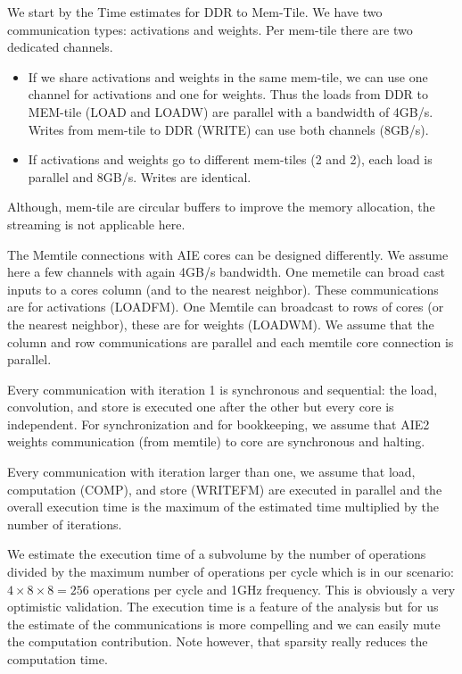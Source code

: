 \documentclass[sigconf]{acmart}
\begin{document}
We start by the Time estimates for DDR to Mem-Tile. We have two
communication types: activations and weights. Per mem-tile there are
two dedicated channels.
\begin{itemize}
 \item If we share activations and weights in the same mem-tile, we
   can use one channel for activations and one for weights. Thus the
   loads from DDR to MEM-tile (LOAD and LOADW) are parallel with a
   bandwidth of 4GB/s. Writes from mem-tile to DDR (WRITE) can use
   both channels (8GB/s). 

 \item If activations and weights go to different mem-tiles (2 and 2),
   each load is parallel and 8GB/s. Writes
   are identical.
\end{itemize}
Although, mem-tile are circular buffers to improve the memory
allocation, the streaming  is not applicable
here. %
   

The Memtile connections with AIE cores can be designed differently. We
assume here a few channels with again 4GB/s bandwidth. One memetile
can broad cast inputs to a cores column (and to the nearest
neighbor). These communications are for activations (LOADFM). One
Memtile can broadcast to rows of cores (or the nearest neighbor),
these are for weights (LOADWM). We assume that the column and row
communications are parallel and each memtile core connection is
parallel.

Every communication with iteration 1 is synchronous and sequential:
the load, convolution, and store is executed one after the other but
every core is independent.  For synchronization and for bookkeeping,
we assume that AIE2 weights communication (from memtile) to core are
synchronous and halting.

Every communication with iteration larger than one, we assume that
load, computation (COMP), and store (WRITEFM) are executed in parallel
and the overall execution time is the maximum of the estimated time
multiplied by the number of iterations.

We estimate the execution time of a subvolume by the number of
operations divided by the maximum number of operations per cycle which
is in our scenario: $4\times 8 \times 8 = 256 $ operations per cycle
and 1GHz frequency. This is obviously a very optimistic
validation. The execution time is a feature of the analysis but for us
the estimate of the communications is more compelling and we can
easily mute the computation contribution. Note however, that sparsity
really reduces the computation time. 
\end{document}
